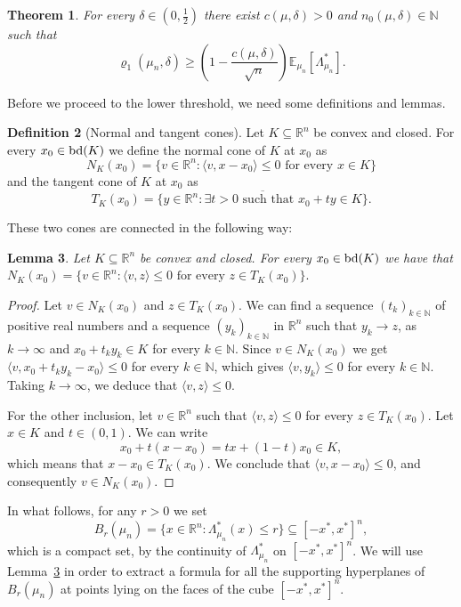 \documentclass[11pt,a4paper]{article} %
\newtheorem{theorem}{Theorem}[section]
\newtheorem{lemma}[theorem]{Lemma}
\theoremstyle{definition}
\newtheorem{definition}[theorem]{Definition}
\theoremstyle{remark}
\newcommand{\1}{\mathds{1}}
\newcommand{\gr}{\ge}
\begin{document}
\begin{theorem}\label{th:upper-mun}
For every $\delta\in \left(0,\tfrac{1}{2}\right)$ there exist $c(\mu,\delta)>0$ and $n_0(\mu,\delta )\in {\mathbb N}$ such that
$$\varrho_1(\mu_n ,\delta )\gr \left(1-\frac{c(\mu,\delta)}{\sqrt{n}}\right)\mathbb{E}_{\mu_n}[\Lambda_{\mu_n}^{*}].$$
\end{theorem}

Before we proceed to the lower threshold, we need some definitions and lemmas.

\begin{definition}[Normal and tangent cones] Let $K \subseteq \mathbb{R}^n$ be  convex and closed. For every $x_0 \in {\rm bd}(K)$ we define the normal cone of $K$ at $x_0$ as $$N_K(x_0)= \{v \in \mathbb{R}^n: \langle v,x-x_0 \rangle \leq 0 \text{ for every } x \in K\} $$ and the tangent cone of $K$ at $x_0$ as $$T_K(x_0)=\overline{\{ y \in \mathbb{R}^n: \exists t>0 \text{ such that } x_0+ty\in K\}} .$$
\end{definition}

These two cones are connected in the following way:

\begin{lemma}\label{lem:cones}
    Let $K \subseteq \mathbb{R}^n$ be convex and closed. For every $x_0 \in {\rm bd}(K)$ we have that $N_K(x_0)=\{v \in \mathbb{R}^n : \langle v,z \rangle \leq 0 \text{ for every } z \in T_K(x_0) \}.$
\end{lemma}

\begin{proof}
    Let $v \in N_K(x_0)$ and $z \in T_K(x_0)$. We can find a sequence $(t_k)_{k \in \mathbb{N}}$ of positive real numbers and a sequence $(y_k)_{k \in \mathbb{N}} $ in $\mathbb{R}^n$ such that $y_k \to z$, as $k \to \infty$ and $x_0+t_ky_k \in K$ for every $k \in \mathbb{N}$. Since $v \in N_K(x_0)$ we get $\langle v,x_0+t_ky_k-x_0 \rangle \leq 0$ for every $k \in \mathbb{N}$, which gives $\langle v,y_k \rangle \leq 0 $ for every $k \in\mathbb{N}$. Taking $k \to \infty$, we deduce that $\langle v,z \rangle \leq 0$.

     For the other inclusion, let $v \in \mathbb{R}^n$ such that $\langle v, z \rangle  \leq 0$ for every $z \in T_K(x_0)$. Let $x \in K$ and $t \in (0,1)$. We can write $$x_0+t(x-x_0)=tx+(1-t)x_0 \in K,$$ which means that $x-x_0 \in T_K(x_0)$. We conclude that $\langle v, x-x_0 \rangle \leq 0$, and consequently $v \in N_K(x_0)$.
\end{proof}

In what follows, for any $r>0$ we set $$B_r(\mu_n)= \{x \in \mathbb{R}^n: \Lambda_{\mu_n}^\ast(x) \leq r \} \subseteq [-x^\ast,x^\ast]^n,$$ which is a compact set, by the continuity of $\Lambda_{\mu_n}^\ast$ on $[-x^\ast,x^\ast]^n$. We will use Lemma~\ref{lem:cones} in order to extract a formula for all the supporting hyperplanes of $B_r(\mu_n)$ at points lying on the faces of the cube $[-x^\ast,x^\ast]^n$.
\end{document}
